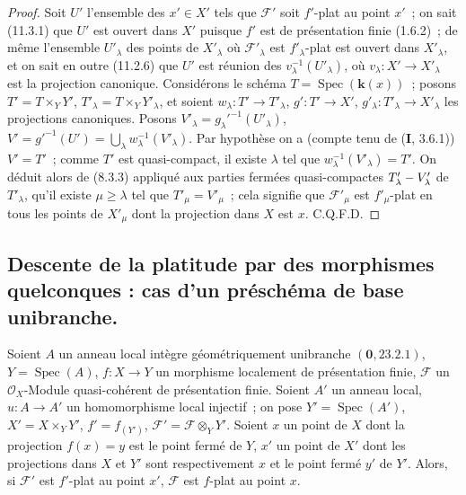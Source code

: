 \begin{proof}
Soit $U'$ l'ensemble des $x'\in X'$ tels que $\mathcal F'$ soit $f'$-plat au
point $x'$~; on sait (11.3.1) que $U'$ est ouvert dans $X'$ puisque $f'$ est de
présentation finie (1.6.2)~; de même l'ensemble $U'_{\lambda}$ des points de
$X'_{\lambda}$ où $\mathcal F'_{\lambda}$ est $f'_{\lambda}$-plat est ouvert
dans $X'_{\lambda}$, et on sait en outre (11.2.6) que $U'$ est réunion des
$v_{\lambda}^{-1}(U'_{\lambda})$, où
$v_{\lambda}:X'\to X'_{\lambda}$ est la projection canonique. Considérons le
schéma $T=\operatorname{Spec}(\boldsymbol{k}(x))$~; posons $T'=T\times_Y Y'$,
$T'_{\lambda}=T\times_Y Y'_{\lambda}$, et soient
$w_{\lambda}:T'\to T'_{\lambda}$, $g':T'\to X'$,
$g'_{\lambda}:T'_{\lambda}\to X'_{\lambda}$ les projections canoniques. Posons
$V'_{\lambda}=g_{\lambda}'^{-1}(U'_{\lambda})$,
$V'=g'^{-1}(U')=\bigcup_{\lambda}w_{\lambda}^{-1}(V'_{\lambda})$. Par
hypothèse on a (compte tenu de (\textbf I, 3.6.1)) $V'=T'$~; comme $T'$ est
quasi-compact, il existe $\lambda$ tel que
$w_{\lambda}^{-1}(V'_{\lambda})=T'$. On déduit alors de (8.3.3) appliqué aux
parties fermées quasi-compactes $T'_{\lambda}- V'_{\lambda}$ de
$T'_{\lambda}$, qu'il existe $\mu\geq\lambda$ tel que
$T'_{\mu}=V'_{\mu}$~; cela signifie que $\mathcal F'_{\mu}$ est
$f'_{\mu}$-plat en tous les points de $X'_{\mu}$ dont la projection dans $X$
est $x$. C.Q.F.D.
\end{proof}

\subsection{Descente de la platitude par des morphismes quelconques : cas d'un
préschéma de base unibranche.}
\label{subsection:IV.11.6-fr}

\begin{theorem}[11.6.1]
\label{IV.11.6.1-fr}
Soient $A$ un anneau local intègre géométriquement unibranche
$(\mathbf 0,23.2.1)$, $Y=\operatorname{Spec}(A)$, $f:X\to Y$ un morphisme
localement de présentation finie, $\mathcal F$ un $\mathcal O_X$-Module
quasi-cohérent de présentation finie. Soient $A'$ un anneau local,
$u:A\to A'$ un homomorphisme local injectif~; on pose
$Y'=\operatorname{Spec}(A')$, $X'=X\times_Y Y'$, $f'=f_{(Y')}$,
$\mathcal F'=\mathcal F\otimes_Y Y'$. Soient $x$ un point de $X$ dont la
projection $f(x)=y$ est le point fermé de $Y$, $x'$ un point de $X'$ dont les
projections dans $X$ et $Y'$ sont respectivement $x$ et le point fermé $y'$ de
$Y'$. Alors, si $\mathcal F'$ est $f'$-plat au point $x'$, $\mathcal F$ est
$f$-plat au point $x$.
\end{theorem}

